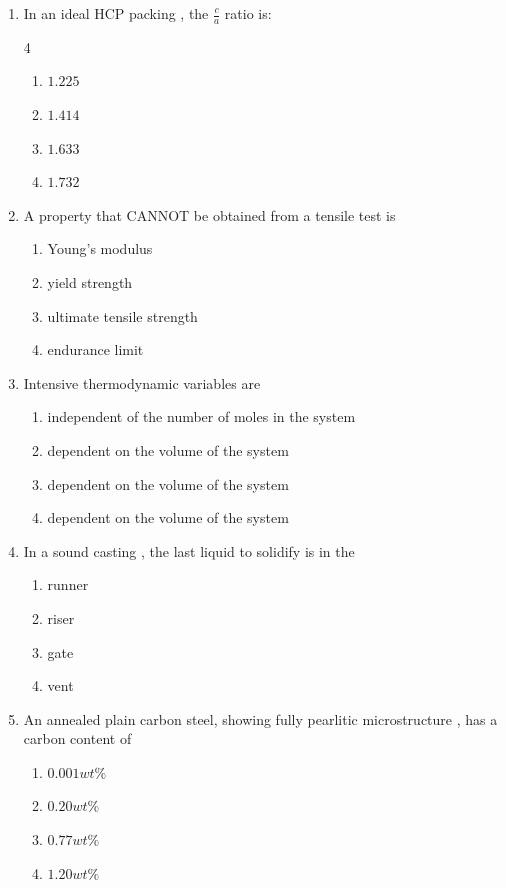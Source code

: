 \documentclass[journal]{IEEEtran}
\theoremstyle{remark}
\begin{document}
\begin{enumerate}
\item  In an ideal HCP packing , the $\frac{c}{a}$ ratio is:\hfill{}

\begin {multicols}{4}
\begin{enumerate}
\item $1.225$
\item $1.414$
\item $1.633$
\item $1.732$
\end{enumerate}
\end{multicols}

\item  A property that CANNOT be obtained from a tensile test is
\hfill{}
\begin{multicols}{2}
\begin{enumerate}
\item Young's modulus
\item yield strength
\item ultimate tensile strength
\item endurance limit
\end{enumerate}
\end{multicols}

\item  Intensive thermodynamic variables are \hfill{}
\begin{enumerate}
\item independent of the number of moles in the system
\item dependent on the volume of the system
\item dependent on the volume of the system
\item dependent on the volume of the system
\end{enumerate}

\item In a sound casting , the last liquid to solidify is in the \hfill{}
\begin{multicols}{4}
\begin{enumerate}
\item runner
\item riser
\item gate
\item vent
\end{enumerate}
\end{multicols}

\item An annealed plain carbon steel, showing fully pearlitic microstructure , has a carbon content of\hfill{}
\begin{multicols}{4}
\begin{enumerate}
\item $0.001wt\%$
\item $0.20wt\%$
\item $0.77wt\%$
\item $1.20wt\%$
\end{enumerate}
\end{multicols}


\end{enumerate}
\end{document}
